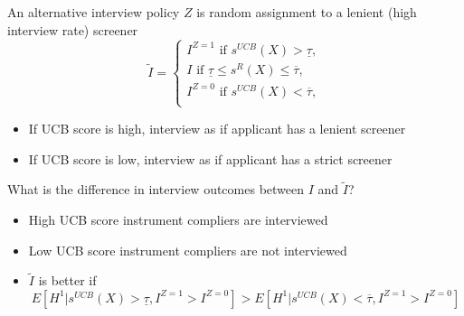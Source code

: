 \documentclass[aspectratio=169,t,11pt,table]{beamer}
\begin{document}

\begin{frame}{An alternative interview policy} \small 
\alert{$Z$ is random assignment to a lenient (high interview rate) screener}
$$
\tilde{I}=
\begin{cases}
I^{Z=1} \text{ if } s^{UCB}(X) > \underline{\tau},\\
I \text{ if }  \underline{\tau} \leq s^{R}(X) \leq \overline{\tau},\\
I^{Z=0} \text{ if } s^{UCB}(X) < \overline{\tau},\\
\end{cases}
$$ \pause
\begin{itemize}
\item If UCB score is high, interview as if applicant has a lenient screener
\item If UCB score is low, interview as if applicant has a strict screener
\end{itemize}
\medskip
\alert{What is the difference in interview outcomes between $I$ and $\tilde{I}$?}
\begin{itemize}
\item High UCB score instrument compliers are interviewed
\item Low UCB score instrument compliers are not interviewed
\item $\tilde{I}$ is better if $$E[H^1| s^{UCB}(X) > \underline{\tau}, I^{Z=1}>I^{Z=0}] > E[H^1| s^{UCB}(X) < \overline{\tau}, I^{Z=1}>I^{Z=0}]$$
\end{itemize}
\end{frame}
\end{document}
